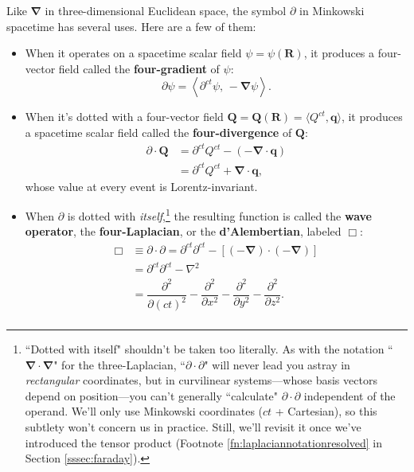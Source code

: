 \documentclass[12pt]{article}
\renewcommand{\vv}[1]{\mathbf{#1}}
\newcommand{\del}{\boldsymbol{\nabla}}
\begin{document}
Like $\del$ in three-dimensional Euclidean space, the symbol $\partialup$ in Minkowski spacetime has several uses. Here are a few of them:
\begin{itemize}
\item{
When it operates on a spacetime scalar field $\psi = \psi (\vv R)$, it produces a four-vector field called the \textbf{four-gradient} of $\psi$:
\begin{equation*}
\partialup \psi = \left \langle \partial^{ct} \psi, \, -\del \psi \right \rangle.
\end{equation*}
}
\item{
When it's dotted with a four-vector field $\vv Q = \vv Q (\vv R) = \langle Q^{ct}, \vv q \rangle$, it produces a spacetime scalar field called the \textbf{four-divergence} of $\vv Q$:
\begin{equation*}
\begin{split}
\partialup \cdot \vv Q &= \partial^{ct} Q^{ct} - \left( - \del \cdot \vv q \right) \\
&= \partial^{ct} Q^{ct} + \del \cdot \vv q ,
\end{split}
\end{equation*}
whose value at every event is Lorentz-invariant.
}
\item{
When $\partialup$ is dotted with \emph{itself},\footnote{\label{fn:laplaciannotation}``Dotted with itself\/" shouldn't be taken too literally. As with the notation ``$\del \cdot \del$" for the three-Laplacian, ``$\partialup \cdot \partialup$" will never lead you astray in \emph{rectangular} coordinates, but in curvilinear systems---whose basis vectors depend on position---you can't generally ``calculate" $\partialup \cdot \partialup$ independent of the operand. We'll only use Minkowski coordinates ($ct$ + Cartesian), so this subtlety won't concern us in practice. Still, we'll revisit it once we've introduced the tensor product (Footnote \ref{fn:laplaciannotationresolved} in Section \ref{sssec:faraday}).} the resulting function is called the \textbf{wave operator}, the \textbf{four-Laplacian}, or the \textbf{d'Alembertian}, labeled $\Box$:
\begin{equation*}
\begin{split}
\Box &\equiv \partialup \cdot \partialup = \partial^{ct} \partial^{ct} - \left[ \left( - \del \right) \cdot \left( - \del \right) \right] \\[3pt]
&= \partial^{ct} \partial^{ct} - \nabla ^2 \\[2pt]
&= \dfrac{\partial^2}{\partial (ct)^2} - \dfrac{\partial^2}{\partial x^2} - \dfrac{\partial^2}{\partial y^2} - \dfrac{\partial^2}{\partial z^2} .\\
\end{split}
\end{equation*}
}
\end{itemize}
\end{document}
